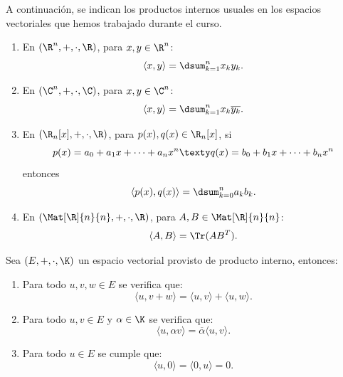 \documentclass[compacto,10pt]{pubciencias-notas}
\begin{document}

A continuación, se indican los productos internos usuales en los espacios vectoriales que hemos trabajado durante el curso.
\begin{enumerate}
\item En $(\R^n,+, \cdot, \R)$, para $x,y\in \R^n$:
\[
    \langle  x, y \rangle  = \dsum_{k=1}^{n}{x_k y_k}.
\]
\item En $(\C^n,+, \cdot, \C)$, para $x,y\in \C^n$:
\[
    \langle  x, y \rangle  = \dsum_{k=1}^{n}{x_k \overline{y_k}}.
\]
\item En $(\R_{n}[x], +, \cdot, \R)$, para $p(x),q(x)\in \R_{n}[x]$, si 
\[  
    p(x) = a_0 + a_1x + \cdots + a_nx^n
    \texty
    q(x) = b_0 + b_1x + \cdots + b_nx^n
\]
entonces
\[
    \langle  p(x), q(x) \rangle  = \dsum_{k=0}^{n}{a_k b_k}.
\]
\item En $(\Mat[\R]{n}{n},+, \cdot, \R)$, para $A,B\in \Mat[\R]{n}{n}$:
\[
    \langle  A, B \rangle  = \Tr(AB^{T}).
\]
\end{enumerate}

\begin{teo}\label{te12:01}
    Sea $(E,+,\cdot,\K)$ un espacio vectorial provisto de producto interno, entonces:
    \begin{enumerate}
        \item 
            Para todo $u,v,w \in E$ se verifica que:
            \[\langle  u, v+w\rangle  = \langle  u,v\rangle  + \langle  u, w \rangle .\]
        \item 
            Para todo $u,v \in E$ y $\alpha \in \K$ se verifica que:
            \[\langle  u, \alpha v\rangle  =  \overline{\alpha}\langle  u,v\rangle .\]
        \item
            Para todo $u\in E$ se cumple que:
            \[\langle  u, 0 \rangle  =  \langle  0, u \rangle   = 0.\]
    \end{enumerate}
\end{teo}
\end{document}
